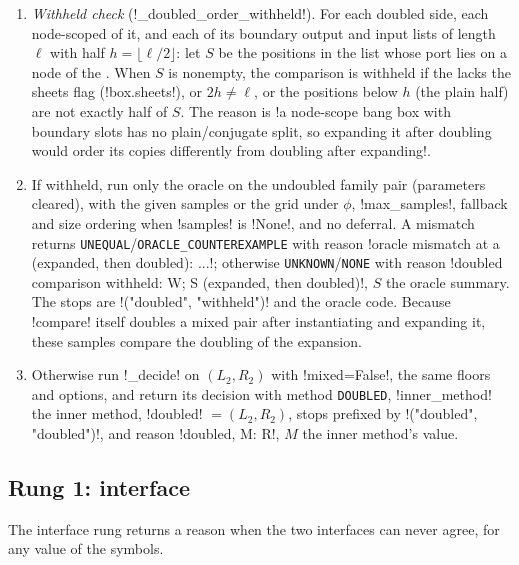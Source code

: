\begin{algorithm}\label{alg:proofs-doubled}
\leavevmode
\begin{enumerate}
\item \emph{Withheld check} (\py!_doubled_order_withheld!). For each doubled side, each node-scoped \bbox{} of it, and each of its boundary output and input lists of length $\ell$ with half $h=\lfloor \ell/2\rfloor$: let $S$ be the positions in the list whose port lies on a node of the \bbox. When $S$ is nonempty, the comparison is withheld if the \bbox{} lacks the sheets flag (\py!box.sheets!), or $2h\neq\ell$, or the positions below $h$ (the plain half) are not exactly half of $S$. The reason is \code!a node-scope bang box with boundary slots has no plain/conjugate split, so expanding it after doubling would order its copies differently from doubling after expanding!.
\item If withheld, run only the oracle on the undoubled family pair (parameters cleared), with the given samples or the grid under $\phi$, \py!max_samples!, fallback and size ordering when \py!samples! is \py!None!, and no deferral. A mismatch returns \texttt{UNEQUAL}/\allowbreak\texttt{ORACLE\_COUNTEREXAMPLE} with reason \code!oracle mismatch at {a} (expanded, then doubled): ...!; otherwise \texttt{UNKNOWN}/\allowbreak\texttt{NONE} with reason \code!doubled comparison withheld: W; S (expanded, then doubled)!, $S$ the oracle summary. The stops are \code!("doubled", "withheld")! and the oracle code. Because \py!compare! itself doubles a mixed pair after instantiating and expanding it, these samples compare the doubling of the expansion.
\item Otherwise run \py!_decide! on $(L_2,R_2)$ with \py!mixed=False!, the same floors and options, and return its decision with method \texttt{DOUBLED}, \py!inner_method! the inner method, \py!doubled! $=(L_2,R_2)$, stops prefixed by \code!("doubled", "doubled")!, and reason \code!doubled, M: R!, $M$ the inner method's value.
\end{enumerate}
\end{algorithm}

\subsection{Rung 1: interface}\label{sec:proofs-rung-interface}

The interface rung returns a reason when the two interfaces can never agree, for any value of the symbols.

